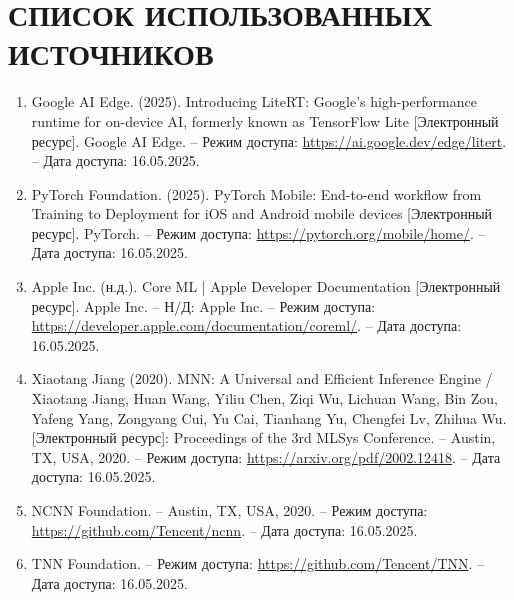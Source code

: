 \documentclass[a4paper,14pt]{extreport}
\begin{document}
    \chapter*{\large СПИСОК ИСПОЛЬЗОВАННЫХ ИСТОЧНИКОВ}
    \hypertarget{sources}{}
    \begin{enumerate}
        \item \hypertarget{[1]}{}Google AI Edge. (2025). Introducing LiteRT: Google's high-performance runtime for on-device AI, formerly known as TensorFlow Lite [Электронный ресурс]. Google AI Edge. – Режим доступа: \href{https://ai.google.dev/edge/litert}{https://ai.google.dev/edge/litert}. – Дата доступа: 16.05.2025.
        
        \item \hypertarget{[2]}{}PyTorch Foundation. (2025). PyTorch Mobile: End-to-end workflow from Training to Deployment for iOS and Android mobile devices [Электронный ресурс]. PyTorch. – Режим доступа: \href{https://pytorch.org/mobile/home/}{https://pytorch.org/mobile/home/}. – Дата доступа: 16.05.2025.
        
        \item \hypertarget{[3]}{}Apple Inc. (н.д.). Core ML | Apple Developer Documentation [Электронный ресурс]. Apple Inc. – Н/Д: Apple Inc. – Режим доступа: \href{https://developer.apple.com/documentation/coreml/}{https://developer.apple.com/documentation/coreml/}. – Дата доступа: 16.05.2025.
        
        \item \hypertarget{[4]}{}Xiaotang Jiang (2020). MNN: A Universal and Efficient Inference Engine / Xiaotang Jiang, Huan Wang, Yiliu Chen, Ziqi Wu, Lichuan Wang, Bin Zou, Yafeng Yang, Zongyang Cui, Yu Cai, Tianhang Yu, Chengfei Lv, Zhihua Wu. [Электронный ресурс]: Proceedings of the 3rd MLSys Conference. – Austin, TX, USA, 2020. – Режим доступа: \href{https://arxiv.org/pdf/2002.12418}{https://arxiv.org/pdf/2002.12418}. – Дата доступа: 16.05.2025.

        \item \hypertarget{[5]}{}NCNN Foundation. – Austin, TX, USA, 2020. – Режим доступа: \href{https://github.com/Tencent/ncnn}{https://github.com/Tencent/ncnn}. – Дата доступа: 16.05.2025.

        \item \hypertarget{[6]}{} TNN Foundation. – Режим доступа: \href{https://github.com/Tencent/TNN}{https://github.com/Tencent/TNN}. – Дата доступа: 16.05.2025.


\end{enumerate}
\end{document}
